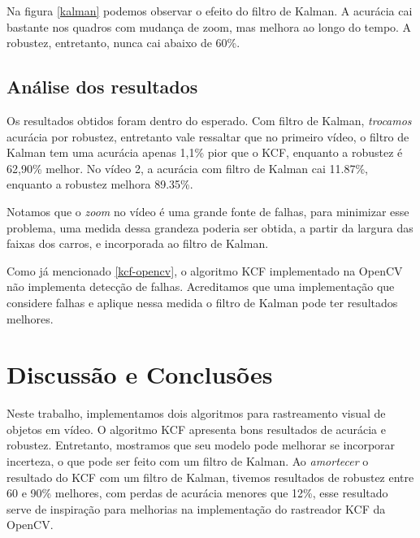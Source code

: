 \documentclass[conference]{IEEEtran}
\begin{document}
Na figura \ref{kalman} podemos observar o efeito do filtro de Kalman. A acurácia cai bastante nos quadros com mudança de zoom, mas melhora ao longo do tempo. A robustez, entretanto, nunca cai abaixo de 60\%.

\subsection{Análise dos resultados}
Os resultados obtidos foram dentro do esperado. Com filtro de Kalman, \textit{trocamos} acurácia por robustez, entretanto vale ressaltar que no primeiro vídeo, o filtro de Kalman tem uma acurácia apenas 1,1\% pior que o KCF, enquanto a robustez é 62,90\% melhor. No vídeo 2, a acurácia com filtro de Kalman cai 11.87\%, enquanto a robustez melhora 89.35\%. 

Notamos que o \textit{zoom} no vídeo é uma grande fonte de falhas, para minimizar esse problema, uma medida dessa grandeza poderia ser obtida, a partir da largura das faixas dos carros, e incorporada ao filtro de Kalman.

Como já mencionado \ref{kcf-opencv}, o algoritmo KCF implementado na OpenCV não implementa detecção de falhas.  Acreditamos que uma implementação que considere falhas e aplique nessa medida o filtro de Kalman pode ter resultados melhores. 


\section{Discussão e Conclusões}
Neste trabalho, implementamos dois algoritmos para rastreamento visual de objetos em vídeo. O algoritmo KCF apresenta bons resultados de acurácia e robustez.  Entretanto, mostramos que seu modelo pode melhorar se incorporar incerteza, o que pode ser feito com um filtro de Kalman. Ao \textit{amortecer}  o resultado do KCF com um filtro de Kalman, tivemos resultados de robustez entre 60 e 90\% melhores, com perdas de acurácia menores que 12\%, esse resultado serve de inspiração para melhorias na implementação do rastreador KCF da OpenCV. 




\end{document}
